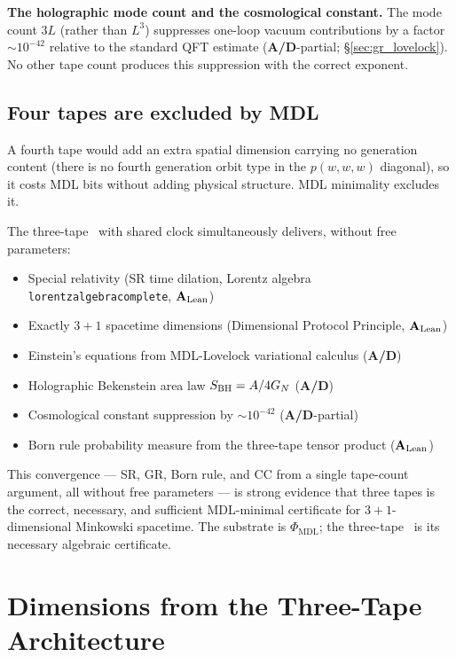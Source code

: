 \documentclass[11pt,openany]{book}
\theoremstyle{remark}
\newcommand{\PHIMDL}{\Phi_{\mathrm{MDL}}}
\newcommand{\lean}[1]{%
  \penalty-100
  \begingroup\def\_{\textunderscore\allowbreak}\texttt{#1}\endgroup}
\newcommand{\CMCA}{\text{CMCA}}
\newcommand{\CatAL}{\ensuremath{\textbf{A}_{\rm Lean}}}
\newcommand{\CatAD}{\textbf{A/D}}
\begin{document}
\textbf{The holographic mode count and the cosmological constant.}
The mode count $3L$ (rather than $L^3$) suppresses one-loop vacuum contributions by a
factor $\sim 10^{-42}$ relative to the standard QFT estimate (\CatAD-partial;
\S\ref{sec:gr_lovelock}).
No other tape count produces this suppression with the correct exponent.

\subsection*{Four tapes are excluded by MDL}

A fourth tape would add an extra spatial dimension carrying no generation content
(there is no fourth generation orbit type in the $p(w,w,w)$ diagonal), so it costs MDL
bits without adding physical structure.
MDL minimality excludes it.

\begin{tcolorbox}[colback=blue!5,colframe=blue!50!black,
  title={Convergent Evidence for Three Tapes}]
The three-tape \CMCA\ with shared clock simultaneously delivers, without free parameters:
\begin{itemize}[nosep,leftmargin=1.4em]
\item Special relativity (SR time dilation, Lorentz algebra \lean{lorentz\_algebra\_complete}, \CatAL)
\item Exactly $3{+}1$ spacetime dimensions (Dimensional Protocol Principle, \CatAL)
\item Einstein's equations from MDL-Lovelock variational calculus (\CatAD)
\item Holographic Bekenstein area law $S_{\rm BH} = A/4G_N$ (\CatAD)
\item Cosmological constant suppression by $\sim 10^{-42}$ (\CatAD-partial)
\item Born rule probability measure from the three-tape tensor product (\CatAL)
\end{itemize}
This convergence --- SR, GR, Born rule, and CC from a single tape-count argument, all
without free parameters --- is strong evidence that three tapes is the correct, necessary,
and sufficient MDL-minimal certificate for $3{+}1$-dimensional Minkowski spacetime.
The substrate is $\PHIMDL$; the three-tape \CMCA\ is its necessary algebraic certificate.
\end{tcolorbox}

\section{Dimensions from the Three-Tape Architecture}
\label{sec:dimensions}
\end{document}
